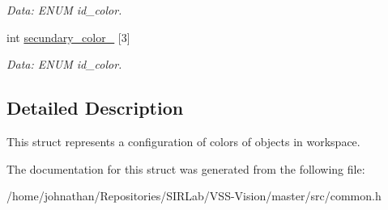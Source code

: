 \begin{DoxyCompactItemize}
\begin{DoxyCompactList}\small\item\em Data\+: E\+N\+UM id\+\_\+color. \end{DoxyCompactList}\item 
int \hyperlink{structcommon_1_1ExecConfiguration_aea1aed941fceb299c6766e6330ec802e}{secundary\+\_\+color\+\_} \mbox{[}3\mbox{]}\hypertarget{structcommon_1_1ExecConfiguration_aea1aed941fceb299c6766e6330ec802e}{}\label{structcommon_1_1ExecConfiguration_aea1aed941fceb299c6766e6330ec802e}

\begin{DoxyCompactList}\small\item\em Data\+: E\+N\+UM id\+\_\+color. \end{DoxyCompactList}\end{DoxyCompactItemize}


\subsection{Detailed Description}
This struct represents a configuration of colors of objects in workspace. 

The documentation for this struct was generated from the following file\+:\begin{DoxyCompactItemize}
\item 
/home/johnathan/\+Repositories/\+S\+I\+R\+Lab/\+V\+S\+S-\/\+Vision/master/src/common.\+h\end{DoxyCompactItemize}
